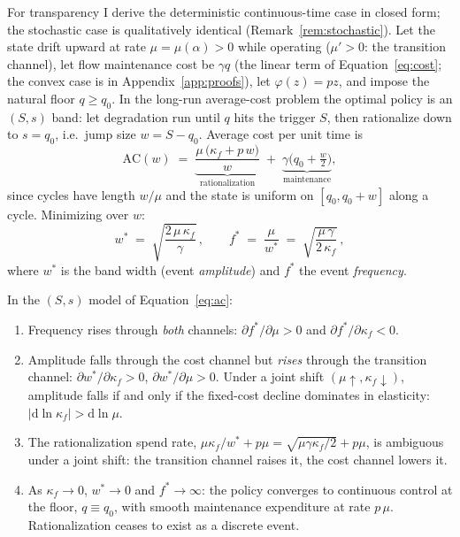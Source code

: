 For transparency I derive the deterministic continuous-time case in closed
form; the stochastic case is qualitatively identical
(Remark~\ref{rem:stochastic}). Let the state drift upward at rate
$\mu = \mu(\alpha) > 0$ while operating ($\mu' > 0$: the transition
channel), let flow maintenance cost be $\gamma q$ (the linear term of
Equation~\eqref{eq:cost}; the convex case is in
Appendix~\ref{app:proofs}), let $\varphi(z) = p z$, and impose the natural
floor $q \geq q_0$. In the long-run average-cost problem the optimal policy
is an $(S,s)$ band: let degradation run until $q$ hits the trigger $S$,
then rationalize down to $s = q_0$, i.e.\ jump size $w = S - q_0$. Average
cost per unit time is
\begin{equation}
    \mathrm{AC}(w) \;=\; \underbrace{\frac{\mu\,\big(\kappa_f + p\,w\big)}{w}}_{\text{rationalization}}
    \;+\; \underbrace{\gamma\Big(q_0 + \tfrac{w}{2}\Big)}_{\text{maintenance}},
    \label{eq:ac}
\end{equation}
since cycles have length $w/\mu$ and the state is uniform on $[q_0, q_0+w]$
along a cycle. Minimizing over $w$:
\begin{equation}
    \boxed{\;
    w^* \;=\; \sqrt{\frac{2\,\mu\,\kappa_f}{\gamma}}\,,
    \qquad
    f^* \;=\; \frac{\mu}{w^*} \;=\; \sqrt{\frac{\mu\,\gamma}{2\,\kappa_f}}\,,
    \;}
    \label{eq:band}
\end{equation}
where $w^*$ is the band width (event \emph{amplitude}) and $f^*$ the event
\emph{frequency}.

\begin{proposition}
\label{prop:band}
In the $(S,s)$ model of Equation~\eqref{eq:ac}:
\begin{enumerate}
    \item[(i)] Frequency rises through \emph{both} channels:
    $\partial f^*/\partial \mu > 0$ and
    $\partial f^*/\partial \kappa_f < 0$.
    \item[(ii)] Amplitude falls through the cost channel but \emph{rises}
    through the transition channel:
    $\partial w^*/\partial \kappa_f > 0$,
    $\partial w^*/\partial \mu > 0$. Under a joint shift
    $(\mu\!\uparrow, \kappa_f\!\downarrow)$, amplitude falls if and only if
    the fixed-cost decline dominates in elasticity:
    $\big|\mathrm{d}\ln \kappa_f\big| > \mathrm{d}\ln \mu$.
    \item[(iii)] The rationalization spend rate,
    $\mu \kappa_f / w^* + p\mu = \sqrt{\mu \gamma \kappa_f / 2} + p\mu$,
    is ambiguous under a joint shift: the transition channel raises it,
    the cost channel lowers it.
    \item[(iv)] As $\kappa_f \to 0$, $w^* \to 0$ and $f^* \to \infty$:
    the policy converges to continuous control at the floor,
    $q \equiv q_0$, with smooth maintenance expenditure at rate $p\,\mu$.
    Rationalization ceases to exist as a discrete event.
\end{enumerate}
\end{proposition}

